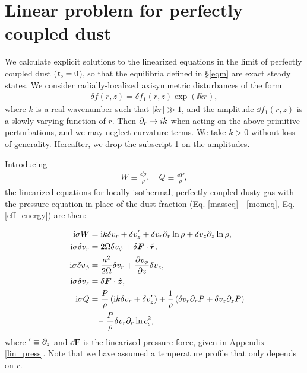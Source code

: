 \section{Linear problem for perfectly coupled dust}\label{linear_problem}
We calculate explicit solutions to the linearized
equations in the limit of perfectly coupled dust ($t_\mathrm{s}=0$), so that
the equilibria defined in \S\ref{eqm} are exact steady states. We 
consider radially-localized axisymmetric disturbances of the form  
\begin{align}
  \delta f (r, z) = \delta f_1(r,z)\exp{(\ii k r)},
\end{align} 
where $k$ is a real wavenumber such that $|kr|\gg 1$, and the
amplitude $\dd f_1(r,z)$ is 
a slowly-varying function of $r$. Then 
$\partial_r\to i k$ when acting on the above primitive perturbations, and we may
neglect curvature terms. We take  
$k>0$ without loss of generality. Hereafter, we drop the subscript 1
on the amplitudes. 

Introducing 
\begin{align}
  W \equiv \frac{\dd\rho}{\rho}, \quad Q \equiv \frac{\dd P}{\rho},
\end{align}
the linearized equations for 
locally isothermal, perfectly-coupled dusty gas with the pressure
equation in place of the dust-fraction
(Eq. \ref{masseq}---\ref{momeq}, Eq. \ref{eff_energy}) are then:    

\begin{align}
  \mathrm{i}\sigma W &= \mathrm{i} k \delta v_r + \delta v_z^\prime +
  \delta v_r \partial_r\ln{\rho} + \delta v_z\partial_z\ln{\rho},\label{lin_mass}\\
  -\mathrm{i}\sigma\delta v_r  &= 2\Omega\delta v_\phi + 
  \delta\bm{F}\cdot\hat{\bm{r}},\label{lin_xmom}\\
  \mathrm{i}\sigma\delta v_\phi &= \frac{\kappa^2}{2\Omega}\delta v_r + \frac{\partial
    v_\phi}{\partial z}\delta v_z, \label{lin_ymom}\\
  -\mathrm{i}\sigma\delta v_z &=  \delta\bm{F}\cdot\hat{\bm{z}},\label{lin_zmom}\\
  \mathrm{i}\sigma Q &= \frac{P}{\rho}\left(\mathrm{i} k \delta v_r + \delta
               v_z^\prime\right) + \frac{1}{\rho}\left(\delta v_r\partial_rP + \delta v_z \partial_zP\right)\notag\\
                &\phantom{=}-\frac{P}{\rho} \delta v_r\partial_r
               \ln{c_s^2}, \label{lin_energy} 
\end{align}  
where $^\prime \equiv \partial_z$ and $\dd\bm{F}$ is the linearized pressure
force, given in Appendix \ref{lin_press}. Note that we have assumed a
temperature profile that only depends on $r$.  

